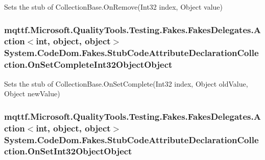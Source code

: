 Sets the stub of Collection\-Base.\-On\-Remove(\-Int32 index, Object value)

\hypertarget{class_system_1_1_code_dom_1_1_fakes_1_1_stub_code_attribute_declaration_collection_ae38c7db418fc5986e8fcceb3f9506602}{
\subsubsection[{On\-Set\-Complete\-Int32\-Object\-Object}]{\setlength{\rightskip}{0pt plus 5cm}mqttf.\-Microsoft.\-Quality\-Tools.\-Testing.\-Fakes.\-Fakes\-Delegates.\-Action$<$int, object, object$>$ System.\-Code\-Dom.\-Fakes.\-Stub\-Code\-Attribute\-Declaration\-Collection.\-On\-Set\-Complete\-Int32\-Object\-Object}}\label{class_system_1_1_code_dom_1_1_fakes_1_1_stub_code_attribute_declaration_collection_ae38c7db418fc5986e8fcceb3f9506602}


Sets the stub of Collection\-Base.\-On\-Set\-Complete(\-Int32 index, Object old\-Value, Object new\-Value)

\hypertarget{class_system_1_1_code_dom_1_1_fakes_1_1_stub_code_attribute_declaration_collection_a2bc8d48d2a6deb614325d8c270822f0d}{
\subsubsection[{On\-Set\-Int32\-Object\-Object}]{\setlength{\rightskip}{0pt plus 5cm}mqttf.\-Microsoft.\-Quality\-Tools.\-Testing.\-Fakes.\-Fakes\-Delegates.\-Action$<$int, object, object$>$ System.\-Code\-Dom.\-Fakes.\-Stub\-Code\-Attribute\-Declaration\-Collection.\-On\-Set\-Int32\-Object\-Object}}\label{class_system_1_1_code_dom_1_1_fakes_1_1_stub_code_attribute_declaration_collection_a2bc8d48d2a6deb614325d8c270822f0d}


